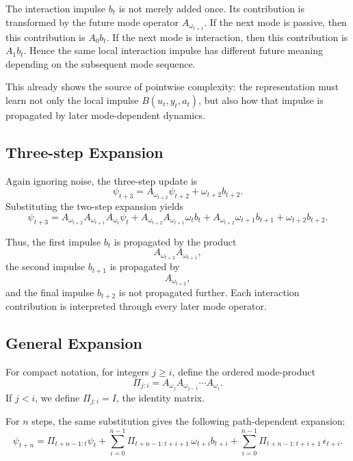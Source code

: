 The interaction impulse \(b_t\) is not merely added once. Its contribution is transformed by the future mode operator \(A_{\omega_{t+1}}\). If the next mode is passive, then this contribution is \(A_0b_t\). If the next mode is interaction, then this contribution is \(A_1b_t\). Hence the same local interaction impulse has different future meaning depending on the subsequent mode sequence.

This already shows the source of pointwise complexity: the representation must learn not only the local impulse \(B(u_t,y_t,a_t)\), but also how that impulse is propagated by later mode-dependent dynamics.

\subsection{Three-step Expansion}

Again ignoring noise, the three-step update is
\begin{equation}
\psi_{t+3}
=
A_{\omega_{t+2}}\psi_{t+2}
+
\omega_{t+2}b_{t+2}.
\end{equation}
Substituting the two-step expansion yields
\begin{equation}
\psi_{t+3}
=
A_{\omega_{t+2}}A_{\omega_{t+1}}A_{\omega_t}\psi_t
+
A_{\omega_{t+2}}A_{\omega_{t+1}}\omega_t b_t
+
A_{\omega_{t+2}}\omega_{t+1}b_{t+1}
+
\omega_{t+2}b_{t+2}.
\end{equation}

Thus, the first impulse \(b_t\) is propagated by the product
\[
A_{\omega_{t+2}}A_{\omega_{t+1}},
\]
the second impulse \(b_{t+1}\) is propagated by
\[
A_{\omega_{t+2}},
\]
and the final impulse \(b_{t+2}\) is not propagated further. Each interaction contribution is interpreted through every later mode operator.

\subsection{General Expansion}

For compact notation, for integers \(j\ge i\), define the ordered mode-product
\begin{equation}
\Pi_{j:i}
=
A_{\omega_j}A_{\omega_{j-1}}\cdots A_{\omega_i}.
\end{equation}
If \(j<i\), we define \(\Pi_{j:i}=I\), the identity matrix.

For \(n\) steps, the same substitution gives the following path-dependent expansion:
\begin{equation}
\boxed{
\psi_{t+n}
=
\Pi_{t+n-1:t}\psi_t
+
\sum_{i=0}^{n-1}
\Pi_{t+n-1:t+i+1}\,
\omega_{t+i}b_{t+i}
+
\sum_{i=0}^{n-1}
\Pi_{t+n-1:t+i+1}\,
\epsilon_{t+i}.
}
\end{equation}

